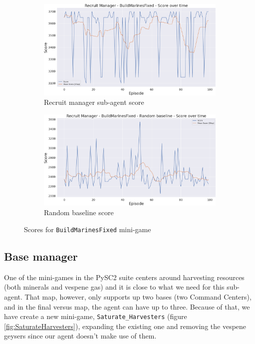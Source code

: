 \begin{figure}[t]
    \centering
    \begin{subfigure}[b]{0.48\textwidth}
        \includegraphics[width=1\textwidth]{figs/multi_dqn_army_recruit_manager/exploit/score.png}
        \caption{Recruit manager sub-agent score}
    \end{subfigure}
    \hfill
    \begin{subfigure}[b]{0.48\textwidth}
        \includegraphics[width=1\textwidth]{figs/multi_random_army_recruit_manager/exploit/score.png}
        \caption{Random baseline score}
    \end{subfigure}
    \caption{Scores for \texttt{BuildMarinesFixed} mini-game}
    \label{fig:BuildMarinesFixed_scores}
\end{figure}

\subsection{Base manager}

One of the mini-games in the PySC2 suite centers around harvesting resources (both minerals and vespene gas) and it is close to what we need for this sub-agent. That map, however, only supports up two bases (two Command Centers), and in the final versus map, the agent can have up to three. Because of that, we have create a new mini-game, \texttt{Saturate\_Harvesters} (figure \ref{fig:SaturateHarvesters}), expanding the existing one and removing the vespene geysers since our agent doesn't make use of them.

